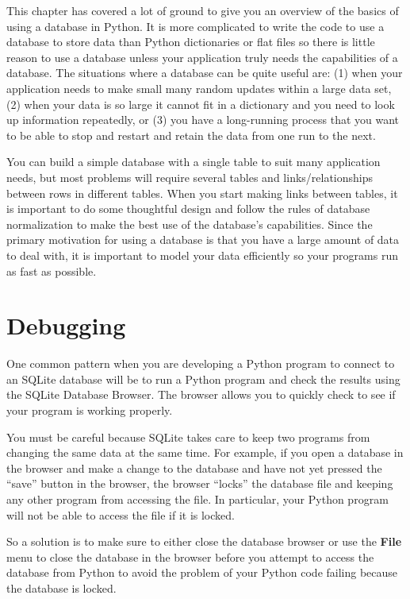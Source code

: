 \documentclass[11pt]{book}
\begin{document}
This chapter has covered a lot of ground to give you an overview of the basics
of using a database in Python.   It is more complicated to write the code to use 
a database to store data than Python dictionaries or flat files so there is 
little reason to use a database unless your application truly needs the capabilities
of a database.  The situations where a database can be quite useful are: 
(1) when your application needs to make small many random updates within a large data set,
(2) when your data is so large it cannot fit in a dictionary and you need to 
look up information repeatedly, or
(3) you have a long-running process that you want to be able to stop 
and restart and retain the data from one run to the next.

You can build a simple database with a single table to suit many application 
needs, but most problems will require several tables and links/relationships
between rows in different tables.   When you start making links between 
tables, it is important to do some thoughtful design and follow the 
rules of database normalization to make the best use of the database's
capabilities.  Since the primary motivation for using a database
is that you have a large amount of data to deal with, it is important
to model your data efficiently so your programs run as fast as possible.

\section{Debugging}

One common pattern when you are developing a Python program to connect to
an SQLite database will be to run a Python program and check the
results using the SQLite Database Browser.  The browser allows you 
to quickly check to see if your program is working properly.

You must be careful because SQLite takes care to keep two programs
from changing the same data at the same time.   For example, if
you open a database in the browser and make a change to the database
and have not yet pressed the ``save'' button in the browser, the 
browser ``locks'' the database file and keeping any other program
from accessing the file.  In particular, your Python program
will not be able to access the file if it is locked.

So a solution is to make sure to either close the database browser 
or use the {\bf File} menu to close the database in the browser
before you attempt to access the database from Python to avoid
the problem of your Python code failing because the database is
locked.
\end{document}
